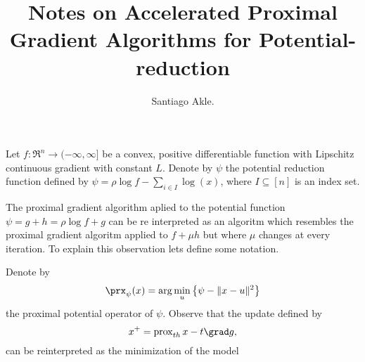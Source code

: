 \documentclass{article}
\title{Notes on Accelerated Proximal Gradient Algorithms for Potential-reduction}
\author{
   Santiago Akle.
}
\newcommand{\px}{\operatorname{prox}}
\newcommand{\xp}{x^+}
\begin{document}
\maketitle

Let $f:\Re^n\to(-\infty,\infty]$ be a convex, positive differentiable function with Lipschitz continuous gradient with constant $L$.
Denote by $\psi$ the potential reduction function defined by $\psi = \rho \log{f} - \sum_{i\in I} \log(x)$, 
where $I\subseteq [n]$ is an index set.  

The proximal gradient algorithm aplied to the potential function $\psi = g + h = \rho \log f+g$ can be 
re interpreted as an algoritm which resembles the proximal gradient algoritm applied to $f + \mu h$ but where
$\mu$ changes at every iteration. To explain this observation lets define some notation.

Denote by 
\begin{equation}
  \prx_\psi(x) = \arg \min_u \left\{  \psi - \|x-u\|^2 \right\}
  \label{def:proc}
\end{equation} the proximal potential operator of $\psi$. Observe that the 
update defined by 
\begin{equation}
  \xp = \px_{th}{x - t\grad g},
\end{equation}
can be reinterpreted as the minimization of the model 
\end{document}
